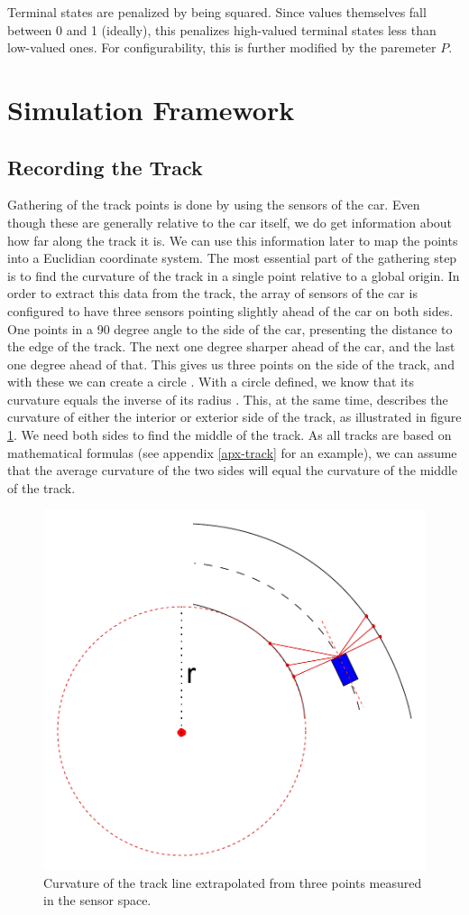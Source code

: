 \documentclass[conference]{IEEEtran}
\begin{document}
Terminal states are penalized by being squared. Since values themselves fall between 0 and 1 (ideally), this penalizes high-valued terminal states less than low-valued ones. For configurability, this is further modified by the paremeter $P$.

\section{Simulation Framework}
\label{sec-model}
\subsection{Recording the Track}
Gathering of the track points is done by using the sensors of the car. Even though these are generally relative to the car itself, we do get information about how far along the track it is. We can use this information later to map the points into a Euclidian coordinate system.
The most essential part of the gathering step is to find the curvature of the track in a single point relative to a global origin. In order to extract this data from the track, the array of sensors of the car is configured to have three sensors pointing slightly ahead of the car on both sides. One points in a 90 degree angle to the side of the car, presenting the distance to the edge of the track. The next one degree sharper ahead of the car, and the last one degree ahead of that. This gives us three points on the side of the track, and with these we can create a circle \cite{circle}. With a circle defined, we know that its curvature equals the inverse of its radius \cite{curve}. This, at the same time, describes the curvature of either the interior or exterior side of the track, as illustrated in figure \ref{fig-curvature}. We need both sides to find the middle of the track. As all tracks are based on mathematical formulas (see appendix \ref{apx-track} for an example), we can assume that the average curvature of the two sides will equal the curvature of the middle of the track.

\begin{figure}
\centerline{\includegraphics[width=0.8\columnwidth]{Curvature.pdf}}
\caption{Curvature of the track line extrapolated from three points measured in the sensor space.}
\label{fig-curvature}
\end{figure}
\end{document}
